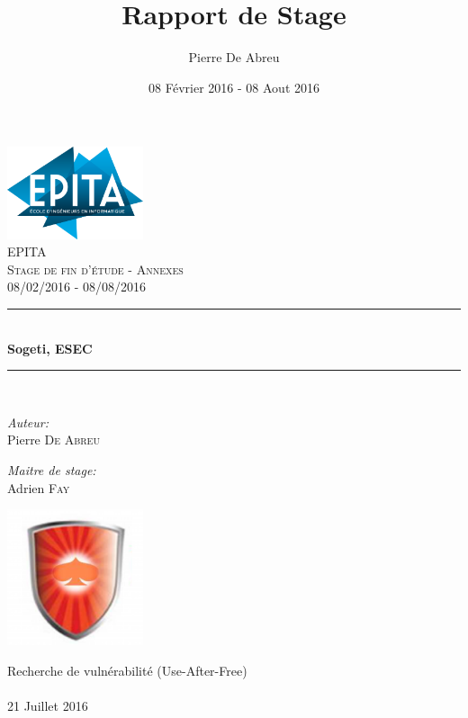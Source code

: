 \documentclass[a4paper, 12pt]{report}
\title{Rapport de Stage}
\author{Pierre De Abreu}
\date{08 Février 2016 - 08 Aout 2016}
\newcommand{\HRule}{\rule{\linewidth}{0.5mm}}
\begin{document}
 
\lstset{language=python}
\begin{titlepage}
\begin{center}

\includegraphics[width=0.3\textwidth]{epita.png}~\\[1cm]

\textsc{\LARGE EPITA}\\[1.5cm]

\textsc{\Large Stage de fin d'étude - Annexes}\\[0.5cm]
\textsc{\Large 08/02/2016 - 08/08/2016}

\HRule \\[0.4cm]
{ \huge \bfseries Sogeti, ESEC \\[0.4cm] }

\HRule \\[1.5cm]

\begin{minipage}{0.4\textwidth}
\begin{flushleft} \large
\emph{Auteur:}\\
Pierre \textsc{De Abreu}
\end{flushleft}
\end{minipage}
\begin{minipage}{0.4\textwidth}
\begin{flushright} \large
\emph{Maitre de stage:} \\
Adrien \textsc{Fay}
\end{flushright}
\end{minipage}

\includegraphics[width=0.3\textwidth]{esec.png}~\\[1cm]

\vfill

{\large Recherche de vulnérabilité (Use-After-Free)\paragraph{}}
{\large 21 Juillet 2016}

\end{center}
\end{titlepage}
\end{document}
